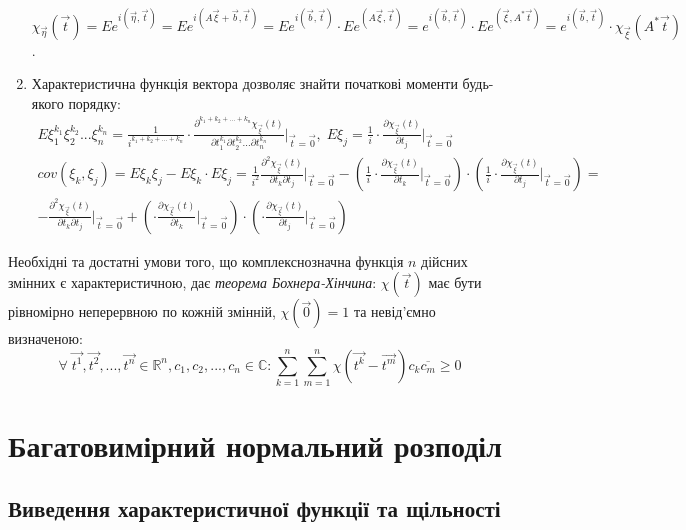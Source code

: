 \begin{enumerate}
    $\chi_{\vec{\eta}}(\vec{t}) = E e^{i(\vec{\eta}, \vec{t})} = E e^{i(A\vec{\xi} + \vec{b}, \vec{t})}=
    E e^{i(\vec{b}, \vec{t})} \cdot E e^{(A\vec{\xi}, \vec{t})} = e^{i(\vec{b}, \vec{t})} \cdot E e^{(\vec{\xi}, A^{*}\vec{t})} = e^{i(\vec{b}, \vec{t})} \cdot \chi_{\vec{\xi}}(A^{*}\vec{t})$.
    \item Характеристична функція вектора дозволяє знайти початкові моменти будь-якого порядку:
    \begin{gather*}
        E\xi_1^{k_1} \xi_2^{k_2} ... \xi_n^{k_n} = \frac{1}{i^{k_1 + k_2 + ... + k_n}} \cdot \frac{\partial^{k_1 + k_2 + ... + k_n}\chi_{\vec{\xi}}(t)}{\partial t_1^{k_1} \partial t_2^{k_2} ... \partial t_n^{k_n}} \Biggr \vert_{\vec{t} = \vec{0}}, 
        \; E\xi_j = \frac{1}{i} \cdot\frac{\partial \chi_{\vec{\xi}}(t)}{\partial t_j} \Biggr \vert_{\vec{t} = \vec{0}} \\
        {cov}(\xi_k, \xi_j) = E\xi_k\xi_j - E\xi_k\cdot E\xi_j = \frac{1}{i^2} \frac{\partial^2 \chi_{\vec{\xi}}(t)}{\partial t_k \partial t_j} \Biggr \vert_{\vec{t} = \vec{0}} - 
        \left( \frac{1}{i} \cdot\frac{\partial \chi_{\vec{\xi}}(t)}{\partial t_k} \Biggr \vert_{\vec{t} = \vec{0}}\right) \cdot \left( \frac{1}{i} \cdot\frac{\partial \chi_{\vec{\xi}}(t)}{\partial t_j} \Biggr \vert_{\vec{t} = \vec{0}}\right) = \\
        -\frac{\partial^2 \chi_{\vec{\xi}}(t)}{\partial t_k \partial t_j} \Biggr \vert_{\vec{t} = \vec{0}} + 
        \left(\cdot\frac{\partial \chi_{\vec{\xi}}(t)}{\partial t_k} \Biggr \vert_{\vec{t} = \vec{0}}\right) \cdot \left(\cdot\frac{\partial \chi_{\vec{\xi}}(t)}{\partial t_j} \Biggr \vert_{\vec{t} = \vec{0}}\right)\end{gather*}
\end{enumerate}

Необхідні та достатні умови того, що комплекснозначна функція $n$ дійсних змінних є характеристичною, дає
\emph{теорема Бохнера-Хінчина}: $\chi(\vec{t})$ має бути рівномірно неперервною по кожній змінній, $\chi(\vec{0}) = 1$ та 
невід'ємно визначеною: $$
    \forall \; \vec{t^1}, \vec{t^2}, ..., \vec{t^n} \in \mathbb{R}^n, c_1, c_2, ..., c_n \in \mathbb{C}: 
    \sum\limits_{k=1}^n {\sum\limits_{m=1}^n \chi(\vec{t^k} - \vec{t^m}) c_k \overline{c_m}} \geq 0
$$

\section{Багатовимірний нормальний розподіл}
\subsection{Виведення характеристичної функції та щільності}

